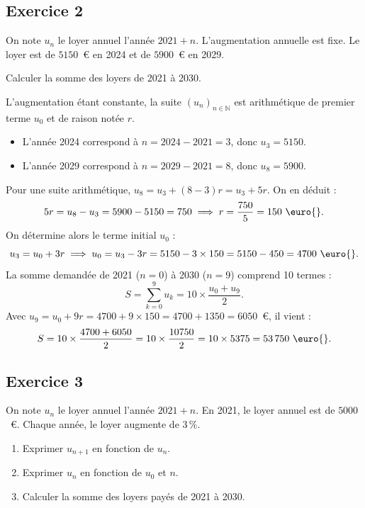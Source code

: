 \documentclass[11pt,a4paper]{article}
\newcommand{\N}{\mathbb{N}}
\begin{document}
\subsection*{Exercice 2}
On note $u_n$ le loyer annuel l'année $2021 + n$. L'augmentation annuelle est fixe. Le loyer est de $5150$~\euro{} en 2024 et de $5900$~\euro{} en 2029.

Calculer la somme des loyers de 2021 à 2030.

\begin{correctionbox}
L'augmentation étant constante, la suite $(u_n)_{n \in \N}$ est arithmétique de premier terme $u_0$ et de raison notée $r$.
\begin{itemize}
    \item L'année 2024 correspond à $n = 2024 - 2021 = 3$, donc $u_3 = 5150$.
    \item L'année 2029 correspond à $n = 2029 - 2021 = 8$, donc $u_8 = 5900$.
\end{itemize}
Pour une suite arithmétique, $u_8 = u_3 + (8-3)r = u_3 + 5r$. On en déduit :
\[
5r = u_8 - u_3 = 5900 - 5150 = 750 \implies r = \frac{750}{5} = 150\text{~\euro{}}.
\]
On détermine alors le terme initial $u_0$ :
\[
u_3 = u_0 + 3r \implies u_0 = u_3 - 3r = 5150 - 3 \times 150 = 5150 - 450 = 4700\text{~\euro{}}.
\]
La somme demandée de 2021 ($n=0$) à 2030 ($n=9$) comprend 10 termes :
\[
S = \sum_{k=0}^9 u_k = 10 \times \frac{u_0 + u_9}{2}.
\]
Avec $u_9 = u_0 + 9r = 4700 + 9 \times 150 = 4700 + 1350 = 6050$~\euro{}, il vient :
\[
S = 10 \times \frac{4700 + 6050}{2} = 10 \times \frac{10750}{2} = 10 \times 5375 = 53\,750\text{~\euro{}}.
\]
\end{correctionbox}

\subsection*{Exercice 3}
On note $u_n$ le loyer annuel l'année $2021 + n$. En 2021, le loyer annuel est de $5000$~\euro{}. Chaque année, le loyer augmente de $3\,\%$.
\begin{enumerate}
    \item Exprimer $u_{n+1}$ en fonction de $u_n$.
    \item Exprimer $u_n$ en fonction de $u_0$ et $n$.
    \item Calculer la somme des loyers payés de 2021 à 2030.
\end{enumerate}
\end{document}
